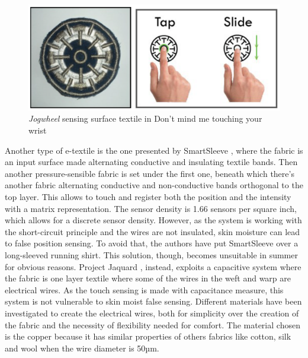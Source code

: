 \documentclass{sigchi}
\begin{document}
\begin{figure}
  \includegraphics[width=\columnwidth]{jogwheel.png}
  \caption{\emph{Jogwheel} sensing surface textile in Don't mind me touching your wrist}
  \label{fig:1}
\end{figure}
%
%
Another type of e-textile is the one presented by SmartSleeve \cite{smart-sleeve}, where the fabric is an input surface made alternating conductive and insulating textile bands. Then another pressure-sensible fabric is set under the first one, beneath which there’s another fabric alternating conductive and non-conductive bands  orthogonal to the top layer. This allows to touch and register both the position and the intensity with a matrix representation. The sensor density is 1.66 sensors per square inch, which allows for a discrete sensor density. However, as the system is working with the short-circuit principle and the wires are not insulated, skin moisture can lead to false position sensing. To avoid that, the authors have put SmartSleeve over a long-sleeved running shirt. This solution, though, becomes unsuitable in summer for obvious reasons. %
%
Project Jaquard \cite{jacquard}, instead, exploits a capacitive system where the fabric is one layer textile where some of the wires in the weft and warp are electrical wires. As the touch sensing is made with capacitance measure, this system is not vulnerable to skin moist false sensing. Different materials have been investigated to create the electrical wires, both for simplicity over the creation of the fabric and the necessity of flexibility needed for comfort. The material chosen is the copper because it has similar properties of others fabrics like cotton, silk and wool when the wire diameter is 50µm.
%
%
%
\end{document}

